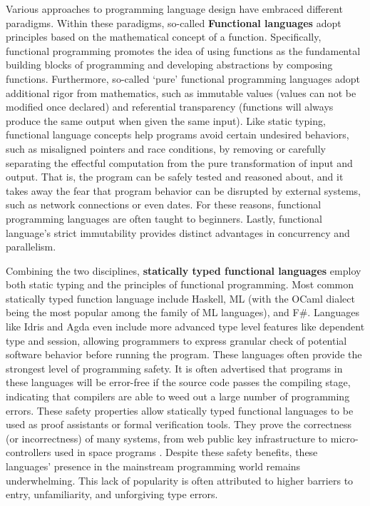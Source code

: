 Various approaches to programming language design have embraced different paradigms. Within these paradigms, so-called \textbf{Functional languages} adopt principles based on the mathematical concept of a function. Specifically, functional programming promotes the idea of using functions as the fundamental building blocks of programming and developing abstractions by composing functions. 
Furthermore, so-called `pure' functional programming languages adopt additional rigor from mathematics, such as immutable values (values can not be modified once declared) and referential transparency (functions will always produce the same output when given the same input).  
Like static typing, functional language concepts help programs avoid certain undesired behaviors, such as misaligned pointers and race conditions, by removing or carefully separating the effectful computation from the pure transformation of input and output.
That is, the program can be safely tested and reasoned about, and it takes away the fear that program behavior can be disrupted by external systems, such as network connections or even dates.  For these reasons, functional programming languages are often taught to beginners. Lastly, functional language's strict immutability provides distinct advantages in concurrency and parallelism.


Combining the two disciplines, \textbf{statically typed functional languages} employ both static typing and the principles of functional programming. Most common statically typed function language include Haskell,  ML (with the OCaml dialect being the most popular among the family of ML languages), and F\#. Languages like Idris and Agda even include more advanced type level features like dependent type and session, allowing programmers to express granular check of potential software behavior before running the program. These languages often provide the strongest level of programming safety. It is often advertised that programs in these languages will be error-free if the source code passes the compiling stage, indicating that compilers are able to weed out a large number of programming errors. These safety properties allow statically typed functional languages to be used as proof assistants or formal verification tools. They prove the correctness (or incorrectness) of many systems, from web public key infrastructure \cite{Bhargavan2021-no} to micro-controllers used in space programs \cite{Mokhov2019-zj}. Despite these safety benefits, these languages' presence in the mainstream programming world remains underwhelming. This lack of popularity is often attributed to higher barriers to entry, unfamiliarity, and unforgiving type errors.

